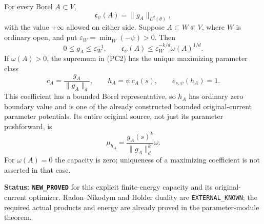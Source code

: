 \begin{theorem}
\label{thm:r12-parameter-energy-capacity-formula}
For every Borel $A\subset V$,
\[
                         \mathfrak c_\psi(A)=\|g_A\|_{L^d(\theta)},
                                                                    \tag{PC5}
\]
with the value $+\infty$ allowed on either side. Suppose
$A\subset W\Subset V$, where $W$ is ordinary open, and put
$\varepsilon_W=\min_{\overline W}(-\psi)>0$. Then
\[
              0\le g_A\le\varepsilon_W^{-1},\qquad
              \mathfrak c_\psi(A)
                    \le\varepsilon_W^{-k/d}\omega(A)^{1/d}.
                                                                    \tag{PC6}
\]
If $\omega(A)>0$, the supremum in (PC2) has the unique
maximizing parameter class
\[
                    c_A=\frac{g_A}{\|g_A\|_d},\qquad
                    h_A=\psi\,c_A(s),\qquad
                    e_{s,\psi}(h_A)=1.
                                                                    \tag{PC7}
\]
This coefficient has a bounded Borel representative, so $h_A$
has ordinary zero boundary value and is one of the already
constructed bounded original-current parameter potentials.
Its entire original source, not just its parameter pushforward,
is
\[
                        \mu_{h_A}
                             =\frac{g_A(s)^k}{\|g_A\|_d^k}\omega.
                                                                    \tag{PC8}
\]
For $\omega(A)=0$ the capacity is zero; uniqueness of a maximizing
coefficient is not asserted in that case.
\end{theorem}

\noindent\textbf{Status: \texttt{NEW\_PROVED}} for this
explicit finite-energy capacity and its original-current optimizer.
Radon--Nikodym and Holder duality are \texttt{EXTERNAL\_KNOWN};
the required actual products and energy are already proved in
the parameter-module theorem.

